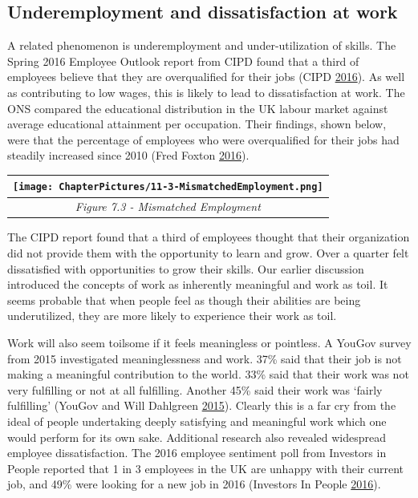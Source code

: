 \documentclass[]{tufte-handout}
\begin{document}
\hypertarget{underemployment-and-dissatisfaction-at-work}{%
\subsection{Underemployment and dissatisfaction at
work}\label{underemployment-and-dissatisfaction-at-work}}

A related phenomenon is underemployment and under-utilization of skills.
The Spring 2016 Employee Outlook report from CIPD found that a third of
employees believe that they are overqualified for their jobs (CIPD
\protect\hyperlink{ref-CIPD2016}{2016}). As well as contributing to low
wages, this is likely to lead to dissatisfaction at work. The ONS
compared the educational distribution in the UK labour market against
average educational attainment per occupation. Their findings, shown
below, were that the percentage of employees who were overqualified for
their jobs had steadily increased since 2010 (Fred Foxton
\protect\hyperlink{ref-FredFoxton2016}{2016}).

\begin{longtable}[]{@{}c@{}}
\toprule
\texttt{[image: ChapterPictures/11-3-MismatchedEmployment.png]}\tabularnewline
\midrule
\endhead
\emph{Figure 7.3 - Mismatched Employment }\tabularnewline
\bottomrule
\end{longtable}

The CIPD report found that a third of employees thought that their
organization did not provide them with the opportunity to learn and
grow. Over a quarter felt dissatisfied with opportunities to grow their
skills. Our earlier discussion introduced the concepts of work as
inherently meaningful and work as toil. It seems probable that when
people feel as though their abilities are being underutilized, they are
more likely to experience their work as toil.

Work will also seem toilsome if it feels meaningless or pointless. A
YouGov survey from 2015 investigated meaninglessness and work. 37\% said
that their job is not making a meaningful contribution to the world.
33\% said that their work was not very fulfilling or not at all
fulfilling. Another 45\% said their work was `fairly fulfilling' (YouGov
and Will Dahlgreen \protect\hyperlink{ref-YouGov2015}{2015}). Clearly
this is a far cry from the ideal of people undertaking deeply satisfying
and meaningful work which one would perform for its own sake. Additional
research also revealed widespread employee dissatisfaction. The 2016
employee sentiment poll from Investors in People reported that 1 in 3
employees in the UK are unhappy with their current job, and 49\% were
looking for a new job in 2016 (Investors In People
\protect\hyperlink{ref-InvestorsinPeopleHQ2016}{2016}).
\end{document}
